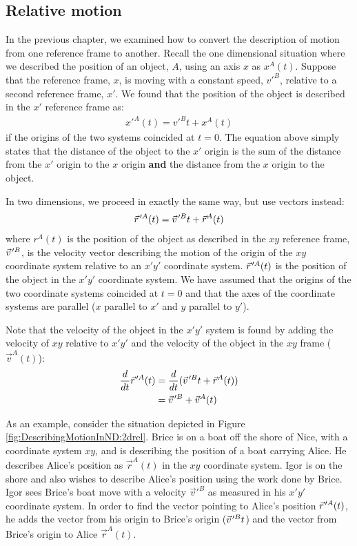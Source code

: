 \subsection{Relative motion}
In the previous chapter, we examined how to convert the description of motion from one reference frame to another. Recall the one dimensional situation where we described the position of an object, $A$, using an axis $x$ as $x^A(t)$. Suppose that the reference frame, $x$, is moving with a constant speed, $v'^B$, relative to a second reference frame, $x'$. We found that the position of the object is described in the $x'$ reference frame as:
\begin{align*}
x'^A(t)=v'^Bt+x^A(t)
\end{align*}
if the origins of the two systems coincided at $t=0$. The equation above simply states that the distance of the object to the $x'$ origin is the sum of the distance from the $x'$ origin to the $x$ origin \textbf{and} the distance from the $x$ origin to the object.

In two dimensions, we proceed in exactly the same way, but use vectors instead:
\begin{align*}
\pvec r'^A(t) = \pvec v'^Bt+\vec r^A(t)
\end{align*}
where $r^A(t)$ is the position of the object as described in the $xy$ reference frame, $\pvec v'^B$, is the velocity vector describing the motion of the origin of the $xy$ coordinate system relative to an $x'y'$ coordinate system. $\pvec r'^A(t)$ is the position of the object in the $x'y'$ coordinate system. We have assumed that the origins of the two coordinate systems coincided at $t=0$ and that the axes of the coordinate systems are parallel ($x$ parallel to $x'$ and $y$ parallel to $y'$).

Note that the velocity of the object in the $x'y'$ system is found by adding the velocity of $xy$ relative to $x'y'$ and the velocity of the object in the $xy$ frame ($\vec v^A(t)$):
\begin{align*}
\frac{d}{dt}\pvec r'^A(t) &=\frac{d}{dt}(\pvec v'^Bt+\vec r^A(t))\\
&=\pvec v'^B+\vec v^A(t)
\end{align*}

As an example, consider the situation depicted in Figure \ref{fig:DescribingMotionInND:2drel}. Brice is on a boat off the shore of Nice, with a coordinate system $xy$, and is describing the position of a boat carrying Alice. He describes Alice's position as $\vec r^A(t)$ in the $xy$ coordinate system. Igor is on the shore and also wishes to describe Alice's position using the work done by Brice. Igor sees Brice's boat move with a velocity $\vec v'^B$ as measured in his $x'y'$ coordinate system. In order to find the vector pointing to Alice's position $\pvec r'^A(t)$, he adds the vector from his origin to Brice's origin ($\pvec v'^B t$) and the vector from Brice's origin to Alice $\vec r^A(t)$.

